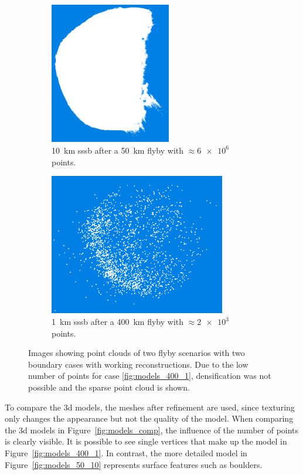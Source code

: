 \begin{figure}[htb]
    \centering
        \begin{subfigure}[b]{0.42\textwidth}
            \centering
            \includegraphics[width=\textwidth,height=6.2cm]{doc/thesis/0_figures/models_quality/50_10/120_50_10_dense2.png}
            \caption{\SI{10}{\kilo\meter} \gls{sssb} after a \SI{50}{\kilo\meter} flyby with $\approx\SI{6e6}{}$ points.}
            \label{fig:points_50_10}
        \end{subfigure}
        \begin{subfigure}[b]{0.42\textwidth}
            \centering
            \includegraphics[width=\textwidth,height=6.2cm]{doc/thesis/0_figures/models_quality/400_1/120_400_1_points2.png}
            \caption{\SI{1}{\kilo\meter} \gls{sssb} after a \SI{400}{\kilo\meter} flyby with $\approx\SI{2e3}{}$ points.}
            \label{fig:points_400_1}
        \end{subfigure}
    \caption{Images showing point clouds of two flyby scenarios with two boundary cases with working reconstructions. Due to the low number of points for case \ref{fig:models_400_1}, densification was not possible and the sparse point cloud is shown.}
    \label{fig:points_dense_comp}
\end{figure}

To compare the \gls{3d} models, the meshes after refinement are used, since texturing only changes the appearance but not the quality of the model. When comparing the \gls{3d} models in Figure~\ref{fig:models_comp}, the influence of the number of points is clearly visible. It is possible to see single vertices that make up the model in Figure~\ref{fig:models_400_1}. In contrast, the more detailed model in Figure~\ref{fig:models_50_10} represents surface features such as boulders.

